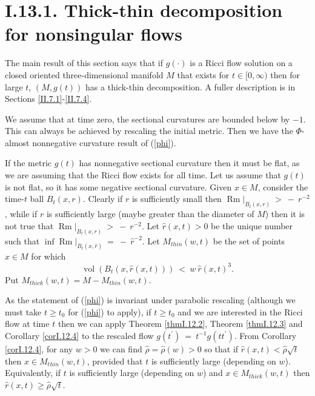 \documentclass[12pt]{amsart}
\newcommand{\Rm}{\operatorname{Rm}}
\newcommand{\vol}{\operatorname{vol}}
\numberwithin{equation}{section}
\theoremstyle{plain}
\theoremstyle{definition}
\theoremstyle{remark}
\begin{document}
\section{I.13.1. Thick-thin decomposition for nonsingular flows} \label{I.13.1}

The main result of this section says that if $g(\cdot)$ is a Ricci flow
solution on a closed oriented three-dimensional manifold $M$ that
exists for $t \in [0, \infty)$ then for large $t$, $(M, g(t))$ has a
thick-thin decomposition. 
A fuller description is in Sections \ref{II.7.1}-\ref{II.7.4}.

We assume that at time zero, the sectional curvatures are bounded below
by $-1$. This can always be achieved by rescaling the initial
metric.  Then we have the $\Phi$-almost nonnegative curvature result of
(\ref{phi}). 

If the metric $g(t)$ has nonnegative sectional curvature then it must be flat, as we are
assuming that the Ricci flow exists for all time. Let us assume that $g(t)$ is not flat, so 
it has some negative sectional curvature.
Given $x \in M$, consider the time-$t$ ball $B_t(x,r)$. Clearly if $r$ is 
sufficiently small then
$\Rm \Big|_{B_t(x,r)} \: > \: - \: r^{-2}$, while if $r$ is sufficiently large
(maybe greater than the diameter of $M$) then it is not true that 
$\Rm \Big|_{B_t(x,r)} \: > \: - \: r^{-2}$.
Let $\widehat{r}(x,t) > 0$ be the unique number such that
$\inf \Rm \Big|_{B_t(x,\widehat{r})} \: = \: - \: \widehat{r}^{-2}$.
Let $M_{thin}(w,t)$ be the set of points $x \in M$ for which
\begin{equation} \label{thinpart}
\vol(B_t(x, \widehat{r}(x,t))) \: < \: w \: \widehat{r}(x,t)^3.
\end{equation}
Put $M_{thick}(w,t) = M - M_{thin}(w,t)$. 

As the statement of (\ref{phi}) is invariant under parabolic rescaling
(although we must take $t \ge t_0$ for (\ref{phi}) to apply), if $t \ge t_0$ 
and we are interested in the Ricci flow at time $t$ then we can apply
Theorem \ref{thmI.12.2}, Theorem \ref{thmI.12.3} and Corollary \ref{corI.12.4}
to the rescaled flow $g(t^\prime) \: = \: t^{-1} g(tt^\prime)$.
From Corollary \ref{corI.12.4}, 
for any $w > 0$ we can find $\widehat{\rho} = \widehat{\rho}(w) > 0$ 
so that if $\widehat{r}(x,t) < \widehat{\rho} \sqrt{t}$ then $x \in M_{thin}(w,t)$,
provided that $t$ is
sufficiently large (depending on $w$). Equivalently, if 
$t$ is sufficiently large (depending on $w$) and $x \in M_{thick}(w,t)$ then
$\widehat{r}(x,t) \ge \widehat{\rho} \sqrt{t}$.
\end{document}
